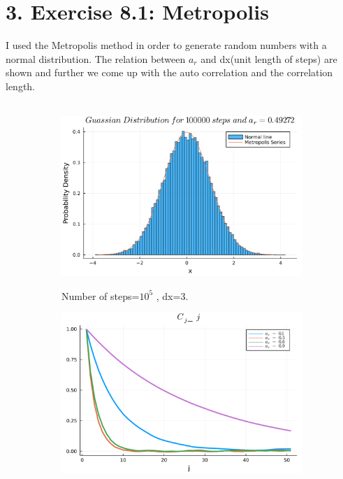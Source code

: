\documentclass[12pt]{article}
\begin{document}
\part*{3. Exercise 8.1: Metropolis}
I used the Metropolis method in order to generate random numbers with a normal distribution. The relation between $a_{r}$ and dx(unit length of steps) are shown and further we come up with the auto correlation and the correlation length. 

\paragraph*{}
\begin{figure}[H]
	\centering
	\begin{subfigure}[t]{0.48\textwidth}
		\includegraphics[width=\textwidth]{HistoPlot.png}
		\label{fig:mesh3.1}
		\caption{Number of steps=$10^{5}$ , dx=3.}
	\end{subfigure}\hfill
	\begin{subfigure}[t]{0.48\textwidth}
		\includegraphics[width=\textwidth]{Cj_j.png}

\end{subfigure}
\end{figure}
\end{document}
